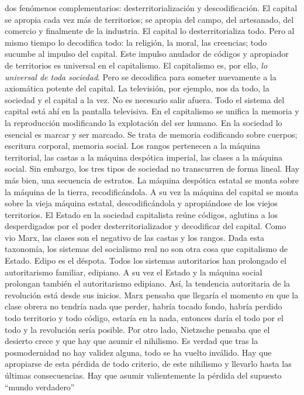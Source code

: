\documentclass[
]{article}
\begin{document}
dos fenómenos complementarios: desterritorialización y descodificación.
El capital se apropia cada vez más de territorios; se apropia del campo,
del artesanado, del comercio y finalmente de la industria. El capital lo
desterritorializa todo. Pero al mismo tiempo lo decodifica todo: la
religión, la moral, las creencias; todo sucumbe al impulso del capital.
Este impulso anulador de códigos y apropiador de territorios es
universal en el capitalismo. El capitalismo es, por ello, \emph{lo
universal de toda sociedad}. Pero se decodifica para someter nuevamente
a la axiomática potente del capital. La televisión, por ejemplo, nos da
todo, la sociedad y el capital a la vez. No es necesario salir afuera.
Todo el sistema del capital está ahí en la pantalla televisiva. En el
capitalismo se unifica la memoria y la reproducción modificando la
explotación del ser humano. En la sociedad lo esencial es marcar y ser
marcado. Se trata de memoria codificando sobre cuerpos; escritura
corporal, memoria social. Los rangos pertenecen a la máquina
territorial, las castas a la máquina despótica imperial, las clases a la
máquina social. Sin embargo, los tres tipos de sociedad no transcurren
de forma lineal. Hay más bien, una secuencia de estratos. La máquina
despótica estatal se monta sobre la máquina de la tierra,
recodificándola. A su vez la máquina del capital se monta sobre la vieja
máquina estatal, descodificándola y apropiándose de los viejos
territorios. El Estado en la sociedad capitalista reúne códigos,
aglutina a los desperdigados por el poder desterritorializador y
decodificar del capital. Como vio Marx, las clases son el negativo de
las castas y los rangos. Dada esta taxonomía, los sistemas del
socialismo real no son otra cosa que capitalismo de Estado. Edipo es el
déspota. Todos los sistemas autoritarios han prolongado el autoritarismo
familiar, edipiano. A su vez el Estado y la máquina social prolongan
también el autoritarismo edipiano. Así, la tendencia autoritaria de la
revolución está desde sus inicios. Marx pensaba que llegaría el momento
en que la clase obrera no tendría nada que perder, habría tocado fondo,
habría perdido todo territorio y todo código, estaría en la nada,
entonces daría el todo por el todo y la revolución sería posible. Por
otro lado, Nietzsche pensaba que el desierto crece y que hay que asumir
el nihilismo. Es verdad que tras la posmodernidad no hay validez alguna,
todo se ha vuelto inválido. Hay que apropiarse de esta pérdida de todo
criterio, de este nihilismo y llevarlo hasta las últimas consecuencias.
Hay que asumir valientemente la pérdida del supuesto ``mundo verdadero''
\end{document}
